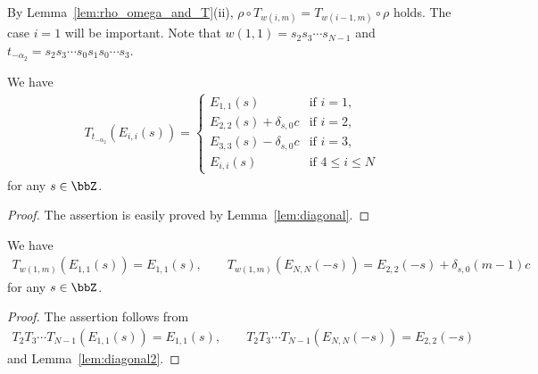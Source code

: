 By Lemma~\ref{lem:rho_omega_and_T}(ii), $\rho \circ T_{w(i,m)} = T_{w(i-1,m)} \circ \rho$ holds. The case $i=1$ will be important. Note that $w(1,1)=s_2 s_3 \cdots s_{N-1}$ and $t_{-\alpha_2} = s_2 s_3 \cdots s_0 s_1 s_0 \cdots s_3$.
\begin{lem}\label{lem:diagonal2}We have
\begin{gather*}
T_{t_{-\alpha_2}}(E_{i,i}(s)) = \begin{cases}
E_{1,1}(s) & \text{if $i=1$}, \\
E_{2,2}(s) + \delta_{s,0}c & \text{if $i=2$}, \\
E_{3,3}(s) - \delta_{s,0}c & \text{if $i=3$}, \\
E_{i,i}(s) & \text{if $4 \leq i \leq N$}
\end{cases}
\end{gather*}
for any $s \in \bbZ$.
\end{lem}
\begin{proof}The assertion is easily proved by Lemma~\ref{lem:diagonal}.
\end{proof}
\begin{lem}\label{lem:i=1_partial}We have
\begin{gather*}
T_{w(1,m)}(E_{1,1}(s)) = E_{1,1}(s),\qquad T_{w(1,m)}(E_{N,N}(-s)) = E_{2,2}(-s) + \delta_{s,0}(m-1)c
\end{gather*}
for any $s \in \bbZ$.
\end{lem}
\begin{proof}The assertion follows from
\begin{gather*}
T_2 T_3 \cdots T_{N-1} (E_{1,1}(s)) = E_{1,1}(s), \qquad T_2 T_3 \cdots T_{N-1} (E_{N,N}(-s)) = E_{2,2}(-s)
\end{gather*}
and Lemma~\ref{lem:diagonal2}.
\end{proof}

